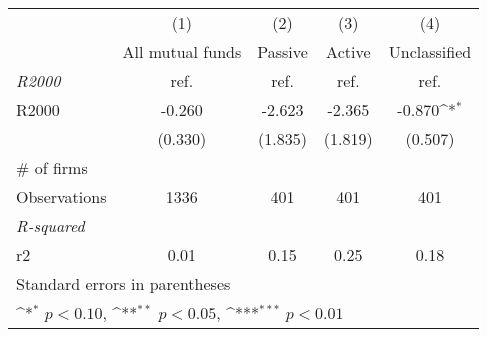 {
\def\sym#1{\ifmmode^{#1}\else\(^{#1}\)\fi}
\begin{tabular}{l*{4}{c}}
\toprule
                &\multicolumn{1}{c}{(1)}&\multicolumn{1}{c}{(2)}&\multicolumn{1}{c}{(3)}&\multicolumn{1}{c}{(4)}\\
                &\multicolumn{1}{c}{All mutual funds}&\multicolumn{1}{c}{Passive}&\multicolumn{1}{c}{Active}&\multicolumn{1}{c}{Unclassified}\\
\midrule
\textit{R2000}  &     ref.         &     ref.         &     ref.         &     ref.         \\
\addlinespace
R2000           &   -0.260         &   -2.623         &   -2.365         &   -0.870\sym{*}  \\
                &  (0.330)         &  (1.835)         &  (1.819)         &  (0.507)         \\
\midrule
\# of firms     &                  &                  &                  &                  \\
Observations    &     1336         &      401         &      401         &      401         \\
\textit{R-squared}&                  &                  &                  &                  \\
r2              &     0.01         &     0.15         &     0.25         &     0.18         \\
\bottomrule
\multicolumn{5}{l}{\footnotesize Standard errors in parentheses}\\
\multicolumn{5}{l}{\footnotesize \sym{*} \(p<0.10\), \sym{**} \(p<0.05\), \sym{***} \(p<0.01\)}\\
\end{tabular}
}
